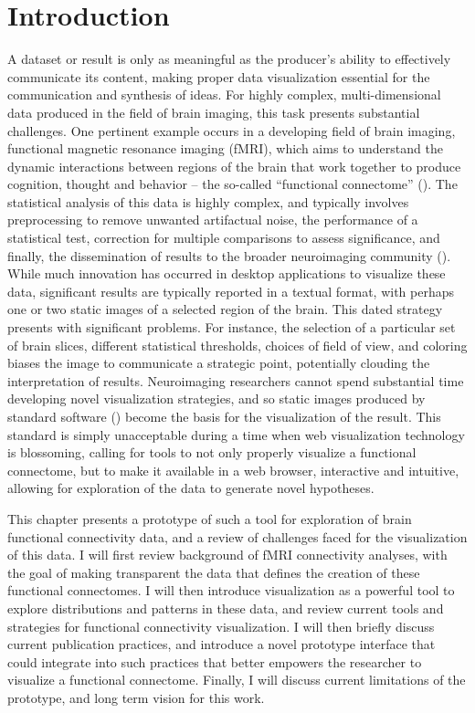 \documentclass{report}
\begin{document}
\section{Introduction}
A dataset or result is only as meaningful as the producer’s ability to effectively communicate its content, making proper data visualization essential for the communication and synthesis of ideas.  For highly complex, multi-dimensional data produced in the field of brain imaging, this task presents substantial challenges.  One pertinent example occurs in a developing field of brain imaging, functional magnetic resonance imaging (fMRI), which aims to understand the dynamic interactions between regions of the brain that work together to produce cognition, thought and behavior – the so-called ``functional connectome'' (\cite{Sporns2012-fc,Kelly2012-hi,Biswal2010-dm,Zuo2012-ba,Bullmore2009-xh,Rubinov2010-js}).  The statistical analysis of this data is highly complex, and typically involves preprocessing to remove unwanted artifactual noise, the performance of a statistical test, correction for multiple comparisons to assess significance, and finally, the dissemination of results to the broader neuroimaging community (\cite{Smith2004-lw,Smith2009-rr,Strother2006-ts}).  While much innovation has occurred in desktop applications to visualize these data, significant results are typically reported in a textual format, with perhaps one or two static images of a selected region of the brain.  This dated strategy presents with significant problems.  For instance, the selection of a particular set of brain slices, different statistical thresholds, choices of field of view, and coloring biases the image to communicate a strategic point, potentially clouding the interpretation of results.  Neuroimaging researchers cannot spend substantial time developing novel visualization strategies, and so static images produced by standard software (\cite{Smith2004-lw,Ashburner1994-vc,Cox1996-rd}) become the basis for the visualization of the result.  This standard is simply unacceptable during a time when web visualization technology \cite{Bostock2011-ei} is blossoming, calling for tools to not only properly visualize a functional connectome, but to make it available in a web browser, interactive and intuitive, allowing for exploration of the data to generate novel hypotheses.

This chapter presents a prototype of such a tool for exploration of brain functional connectivity data, and a review of challenges faced for the visualization of this data.  I will first review background of fMRI connectivity analyses, with the goal of making transparent the data that defines the creation of these functional connectomes.  I will then introduce visualization as a powerful tool to explore distributions and patterns in these data, and review current tools and strategies for functional connectivity visualization.  I will then briefly discuss current publication practices, and introduce a novel prototype interface that could integrate into such practices that better empowers the researcher to visualize a functional connectome.  Finally, I will discuss current limitations of the prototype, and long term vision for this work.
\end{document}
